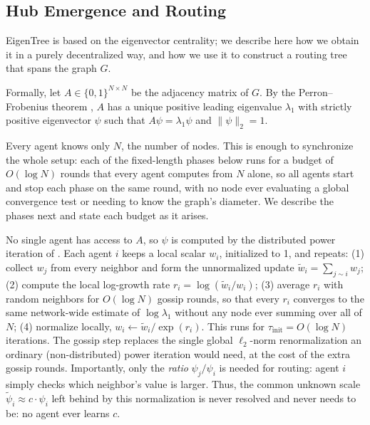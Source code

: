 \documentclass[letterpaper]{article} %
\begin{document}
\subsection{Hub Emergence and Routing}
EigenTree is based on the eigenvector centrality; we describe here how we obtain
it in a purely decentralized way, and how we use it to construct a routing tree
that spans the graph $G$.

Formally, let $A \in \{0,1\}^{N \times N}$ be the adjacency matrix of $G$. By
the Perron--Frobenius theorem \citep{hornjohnson2013}, $A$ has a unique
positive leading eigenvalue $\lambda_1$ with strictly positive eigenvector
$\psi$ such that $A\psi = \lambda_1 \psi$ and $\|\psi\|_2 = 1$.

Every agent knows only $N$, the number of nodes. This is enough to synchronize
the whole setup: each of the fixed-length phases below runs for a budget of
$O(\log N)$ rounds that every agent computes from $N$ alone, so all agents start
and stop each phase on the same round, with no node ever evaluating a global
convergence test or needing to know the graph's diameter. We describe the phases
next and state each budget as it arises.

No single agent has access to $A$, so $\psi$ is computed by the distributed
power iteration of \citep{jelasity2007asynchronous}. Each agent $i$ keeps a
local scalar $w_i$, initialized to 1, and repeats: (1) collect $w_j$ from every
neighbor and form the unnormalized update $\tilde w_i = \sum_{j\sim i} w_j$;
(2) compute the local log-growth rate $r_i = \log(\tilde w_i/w_i)$; (3) average
$r_i$ with random neighbors for $O(\log N)$ gossip rounds, so that every $r_i$
converges to the same network-wide estimate of $\log\lambda_1$ without any node
ever summing over all of $N$; (4) normalize locally, $w_i \leftarrow \tilde
w_i/\exp(r_i)$. This runs for $\tau_{\mathrm{init}} = O(\log N)$ iterations. The
gossip step replaces the single global $\ell_2$-norm renormalization an ordinary
(non-distributed) power iteration would need, at the cost of the extra gossip
rounds. Importantly, only the \emph{ratio} $\psi_j/\psi_i$ is needed for
routing: agent $i$ simply checks which neighbor's value is larger. Thus, the
common unknown scale $\tilde\psi_i \approx c\cdot\psi_i$ left behind by this
normalization is never resolved and never needs to be: no agent ever learns
$c$.
\end{document}
